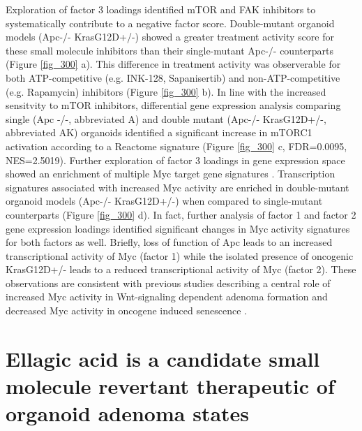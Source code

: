 \begin{flushleft}
Exploration of factor 3 loadings identified mTOR and FAK inhibitors to systematically contribute to a negative factor score. Double-mutant organoid models (Apc-/- KrasG12D+/-) showed a greater treatment activity score for these small molecule inhibitors than their single-mutant Apc-/- counterparts (Figure \ref{fig_300} a). This difference in treatment activity was observerable for both ATP-competitive (e.g. INK-128, Sapanisertib) and non-ATP-competitive (e.g. Rapamycin) inhibitors (Figure \ref{fig_300} b). In line with the increased sensitvity to mTOR inhibitors, differential gene expression analysis comparing single (Apc -/-, abbreviated A) and double mutant (Apc-/- KrasG12D+/-, abbreviated AK) organoids identified a significant increase in mTORC1 activation according to a Reactome signature (Figure \ref{fig_300} c, FDR=0.0095, NES=2.5019). Further exploration of factor 3 loadings in gene expression space showed an enrichment of multiple Myc target gene signatures \cite{Yu2005-em, Zeller2003-ok}. Transcription signatures associated with increased Myc activity are enriched in double-mutant organoid models (Apc-/- KrasG12D+/-) when compared to single-mutant counterparts (Figure \ref{fig_300} d). In fact, further analysis of factor 1 and factor 2 gene expression loadings identified significant changes in Myc activity signatures for both factors as well. Briefly, loss of function of Apc leads to an increased transcriptional activity of Myc (factor 1) while the isolated presence of oncogenic KrasG12D+/- leads to a reduced transcriptional activity of Myc (factor 2). These observations are consistent with previous studies describing a central role of increased Myc activity in Wnt-signaling dependent adenoma formation \cite{Satoh2017-nd} and decreased Myc activity in oncogene induced senescence \cite{Yao2018-ut}.


\newpage
\section{Ellagic acid is a candidate small molecule revertant therapeutic of organoid adenoma states}


\end{flushleft}
